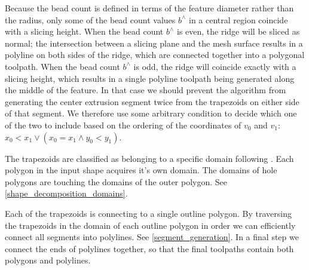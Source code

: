Because the bead count is defined in terms of the feature diameter rather than the radius, only some of the bead count values $b^\wedge$ in a central region coincide with a slicing height.
When the bead count $b^\wedge$ is even, the ridge will be sliced as normal;
the intersection between a slicing plane and the mesh surface results in a polyline on both sides of the ridge, which are connected together into a polygonal toolpath.
When the bead count $b^\wedge$ is odd, the ridge will coincide exactly with a slicing height, which results in a single polyline toolpath being generated along the middle of the feature.
In that case we should prevent the algorithm from generating the center extrusion segment twice from the trapezoids on either side of that segment.
We therefore use some arbitrary condition to decide which one of the two to include based on the ordering of the coordinates of $v_0$ and $v_1$: $x_0 < x_1 \lor (x_0 = x_1 \land y_0 < y_1)$.

The trapezoids are classified as belonging to a specific domain following \citeauthor{Ding2016a}.
Each polygon in the input shape acquires it's own domain.
The domains of hole polygons are touching the domains of the outer polygon.
See \cref{shape_decomposition_domains}.

Each of the trapezoids is connecting to a single outline polygon.
By traversing the trapezoids in the domain of each outline polygon in order we can efficiently connect all segments into polylines.
See \cref{segment_generation}.
In a final step we connect the ends of polylines together, so that the final toolpaths contain both polygons and polylines.

